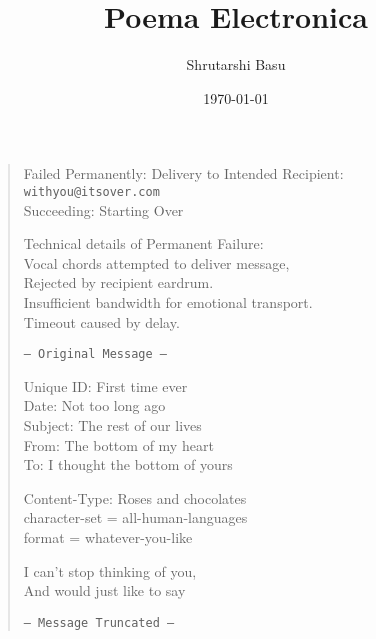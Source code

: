 \documentclass[12pt,letterpaper]{article}
\title{Poema Electronica}
\author{Shrutarshi Basu}
\date{\today}
\begin{document}
\maketitle
\begin{verse}
Failed Permanently: Delivery to Intended Recipient:\\
\texttt{withyou@itsover.com}\\
Succeeding: Starting Over

Technical details of Permanent Failure:\\
Vocal chords attempted to deliver message,\\
Rejected by recipient eardrum.\\
Insufficient bandwidth for emotional transport.\\
Timeout caused by delay.

\texttt{--- Original Message ---}

Unique ID: First time ever\\
Date: Not too long ago\\
Subject: The rest of our lives\\
From: The bottom of my heart\\
To: I thought the bottom of yours

Content-Type: Roses and chocolates\\
character-set = all-human-languages\\
format = whatever-you-like

I can't stop thinking of you,\\
And would just like to say

\texttt{--- Message Truncated ---\\}
\end{verse}

\end{document}
